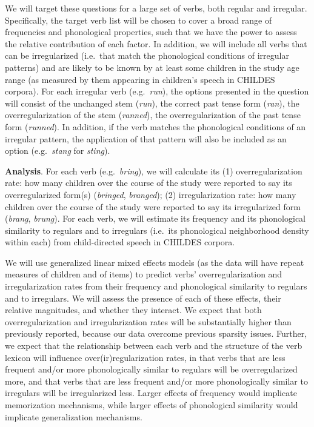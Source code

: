 \documentclass[
   11pt,
       ]{book}
\begin{document}
We will target these questions for a large set of verbs, both regular and irregular.
Specifically, the target verb list will be chosen to cover a broad range of frequencies and phonological properties, such that we have the power to assess the relative contribution of each factor.
In addition, we will include all verbs that can be irregularized (i.e.~that match the phonological conditions of irregular patterns) and are likely to be known by at least some children in the study age range (as measured by them appearing in children's speech in CHILDES corpora).
For each irregular verb (e.g.~\emph{run}), the options presented in the question will consist of the unchanged stem (\emph{run}), the correct past tense form (\emph{ran}), the overregularization of the stem (\emph{ranned}), the overregularization of the past tense form (\emph{runned}).
In addition, if the verb matches the phonological conditions of an irregular pattern, the application of that pattern will also be included as an option (e.g.~\emph{stang} for \emph{sting}).

\textbf{Analysis}. For each verb (e.g.~\emph{bring}), we will calculate its (1) overregularization rate: how many children over the course of the study were reported to say its overregularized form(s) (\emph{bringed}, \emph{branged}); (2) irregularization rate: how many children over the course of the study were reported to say its irregularized form (\emph{brang}, \emph{brung}).
For each verb, we will estimate its frequency and its phonological similarity to regulars and to irregulars (i.e.~its phonological neighborhood density within each) from child-directed speech in CHILDES corpora.

We will use generalized linear mixed effects models (as the data will have repeat measures of children and of items) to predict verbs' overregularization and irregularization rates from their frequency and phonological similarity to regulars and to irregulars. We will assess the presence of each of these effects, their relative magnitudes, and whether they interact. We expect that both overregularization and irregularization rates will be substantially higher than previously reported, because our data overcome previous sparsity issues. Further, we expect that the relationship between each verb and the structure of the verb lexicon will influence over(ir)regularization rates, in that verbs that are less frequent and/or more phonologically similar to regulars will be overregularized more, and that verbs that are less frequent and/or more phonologically similar to irregulars will be irregularized less. Larger effects of frequency would implicate memorization mechanisms, while larger effects of phonological similarity would implicate generalization mechanisms.
\end{document}
